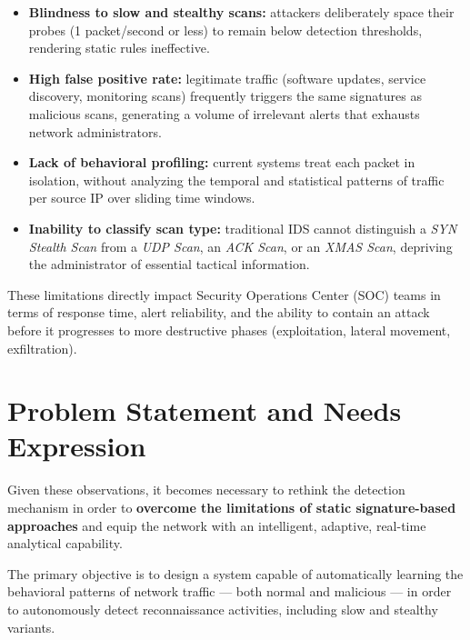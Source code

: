 \documentclass[12pt,a4paper]{article}
\begin{document}
\begin{itemize}[nosep,leftmargin=1.5em]
  \item \textbf{Blindness to slow and stealthy scans:} attackers deliberately
        space their probes (1 packet/second or less) to remain below detection
        thresholds, rendering static rules ineffective.
  \item \textbf{High false positive rate:} legitimate traffic (software updates,
        service discovery, monitoring scans) frequently triggers the same
        signatures as malicious scans, generating a volume of irrelevant alerts
        that exhausts network administrators.
  \item \textbf{Lack of behavioral profiling:} current systems treat each packet
        in isolation, without analyzing the temporal and statistical patterns of
        traffic per source IP over sliding time windows.
  \item \textbf{Inability to classify scan type:} traditional IDS cannot
        distinguish a \textit{SYN Stealth Scan} from a \textit{UDP Scan}, an
        \textit{ACK Scan}, or an \textit{XMAS Scan}, depriving the administrator
        of essential tactical information.
\end{itemize}

These limitations directly impact Security Operations Center (SOC) teams in
terms of response time, alert reliability, and the ability to contain an attack
before it progresses to more destructive phases (exploitation, lateral movement,
exfiltration).

\section{Problem Statement and Needs Expression}

Given these observations, it becomes necessary to rethink the detection
mechanism in order to \textbf{overcome the limitations of static signature-based
approaches} and equip the network with an intelligent, adaptive, real-time
analytical capability.

The primary objective is to design a system capable of automatically learning the
behavioral patterns of network traffic --- both normal and malicious --- in order
to autonomously detect reconnaissance activities, including slow and stealthy
variants.
\end{document}
